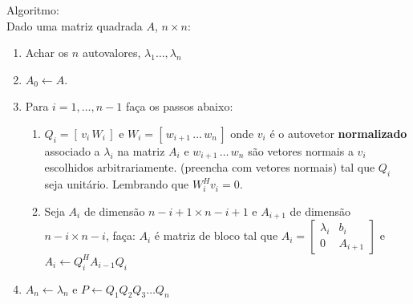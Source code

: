 \documentclass[10pt,a4paper]{article}
\begin{document}
Algoritmo:\\
Dado uma matriz quadrada $A$, $n \times n$:
\begin{enumerate}
	\item Achar os $n$ autovalores, $\lambda_1 \dots, \lambda_n$
	\item $A_0 \leftarrow A$.
	\item Para $i = 1, \dots, n - 1$ faça os passos abaixo:
	\begin{enumerate}[label*=\arabic*.]
		\item $Q_i = [ \, v_i \, W_i \, ]$ e $W_i = [ \, w_{i+1} \, \dots \, w_{n} \, ]$ onde $v_i$ é o autovetor \textbf{normalizado} associado a $\lambda_i$ na matriz $A_i$ e $w_{i+1} \, \dots \, w_{n}$ são vetores normais a $v_i$ escolhidos arbitrariamente. (preencha com vetores normais) tal que $Q_i$ seja unitário. Lembrando que $W_i^Hv_i = 0$.
		\item Seja $A_i$ de dimensão $n - i + 1 \times n - i + 1$ e $A_{i+1}$ de dimensão $n - i \times n - i$, faça:
		$A_i$ é matriz de bloco tal que $A_i = \left[\begin{array}{cc}
			\lambda_i &     b_i \\
			        0 & A_{i+1}
		\end{array}\right]$ e  $A_i \leftarrow Q_i^H A_{i-1} Q_i$
	\end{enumerate}
	\item $A_n \leftarrow \lambda_n$ e $P \leftarrow Q_1 Q_2 Q_3 \dots Q_n$
\end{enumerate}
\end{document}
